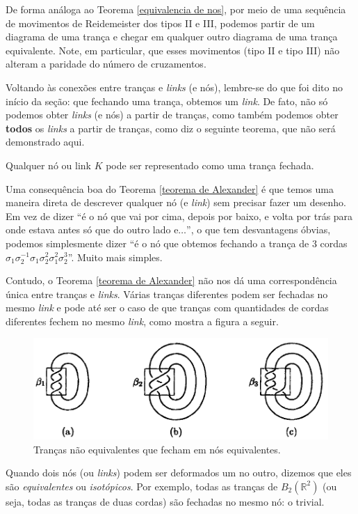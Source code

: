 	\par\vspace{0.3cm} De forma análoga ao Teorema \ref{equivalencia de nos}, por meio de uma 
	sequência de movimentos de Reidemeister dos tipos II e III, podemos partir de um diagrama 
	de uma trança e chegar em qualquer outro diagrama de uma trança equivalente. 
	Note, em particular, que esses movimentos (tipo II e tipo III) não alteram a paridade do 
	número de cruzamentos.
	
	\par\vspace{0.3cm} Voltando às conexões entre tranças e \textit{links} (e nós), lembre-se 
	do que foi dito no início da seção: que fechando uma trança, obtemos um \textit{link}. 
	De fato, não só podemos obter \textit{links} (e nós) a partir de tranças, como também 
	podemos obter \textbf{todos} os \textit{links} a partir de tranças, como diz o seguinte 
	teorema, que não será demonstrado aqui.
	\begin{theorem}[Alexander]
	\label{teorema de Alexander}
		Qualquer nó ou link $K$ pode ser representado como uma trança fechada.
	\end{theorem}
	Uma consequência boa do Teorema \ref{teorema de Alexander} é que temos uma maneira direta de 
	descrever qualquer nó (e \textit{link}) sem precisar fazer um desenho. Em vez de dizer 
	``é o nó que vai por cima, depois por baixo, e volta por trás para onde estava antes só que 
	do outro lado e$\dots$'', o que tem desvantagens óbvias, podemos simplesmente dizer ``é o nó 
	que obtemos fechando a trança de 3 cordas $\sigma_1\sigma_2^{-1}\sigma_1\sigma_2^2\sigma_1^2\sigma_2^3$''.
	Muito mais simples.
	
	\par\vspace{0.3cm} Contudo, o Teorema \ref{teorema de Alexander} não nos dá uma correspondência 
	única entre tranças e \textit{links}. Várias tranças diferentes podem ser fechadas no mesmo 
	\textit{link} e pode até ser o caso de que tranças com quantidades de cordas diferentes 
	fechem no mesmo \textit{link}, como mostra a figura a seguir.
	\begin{figure}[H]
		\begin{center}
			\includegraphics[width=12cm]{Images/fechamento_de_trancas_em_nos.png}
		\end{center}\caption{Tranças não equivalentes que fecham em nós equivalentes.}
		\label{fechamento de trancas em nos}
	\end{figure}
	Quando dois nós (ou \textit{links}) podem ser deformados um no outro, dizemos que eles 
	são \textit{equivalentes} ou \textit{isotópicos}. Por exemplo, todas as tranças de 
	$B_2(\mathbb{R}^2)$ (ou seja, todas as tranças de duas cordas) são fechadas no 
	mesmo nó: o trivial.
	
